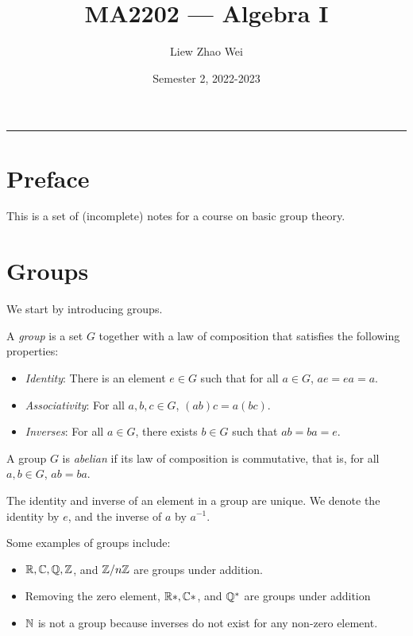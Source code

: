 \documentclass{article}
\title{MA2202 --- Algebra I}
\author{Liew Zhao Wei}
\date{Semester 2, 2022-2023}
\begin{document}
\maketitle
\hrule

\section{Preface}

This is a set of (incomplete) notes for a course on basic group theory.

\section{Groups}

We start by introducing groups.

\begin{definition}[Group]
  A \emph{group} is a set $G$ together with a law of composition that satisfies the following properties:
  \begin{itemize}
    \item \emph{Identity}: There is an element $e \in G$ such that for all $a \in G$, $ae = ea = a$.
    \item \emph{Associativity}: For all $a, b, c \in G$, $(ab)c = a(bc)$.
    \item \emph{Inverses}: For all $a \in G$, there exists $b \in G$ such that $ab = ba = e$.
  \end{itemize}
\end{definition}

\begin{definition}
  A group $G$ is \emph{abelian} if its law of composition is commutative, that is, for all $a, b \in G$, $ab = ba$.
\end{definition}

\begin{remark}
  The identity and inverse of an element in a group are unique.
  We denote the identity by $e$, and the inverse of $a$ by $a^{-1}$.
\end{remark}

\begin{example}
  Some examples of groups include:
  \begin{itemize}
    \item $\mathbb{R}, \mathbb{C}, \mathbb{Q}, \mathbb{Z}$, and $\mathbb{Z} / n \mathbb{Z}$ are groups under addition.
    \item Removing the zero element, $\mathbb{R}*, \mathbb{C}*$, and $\mathbb{Q}^*$ are groups under addition
    \item $\mathbb{N}$ is not a group because inverses do not exist for any non-zero element.
  \end{itemize}
\end{example}
\end{document}
